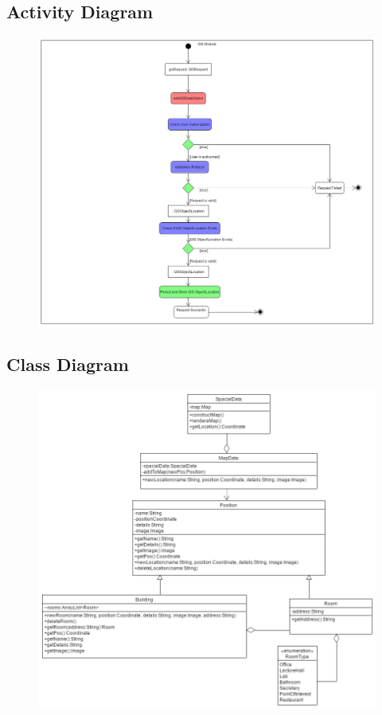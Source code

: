 
\subsection{Activity Diagram}
\begin{figure}[!htbp]
	\includegraphics[width=\textwidth]{GIS/GIS_Activity-addGISObject.png}
\end{figure}

\subsection{Class Diagram}
\begin{figure}[!htbp]
	\includegraphics[width=\textwidth]{GIS/GIS_Class_Diagram.png}
\end{figure}